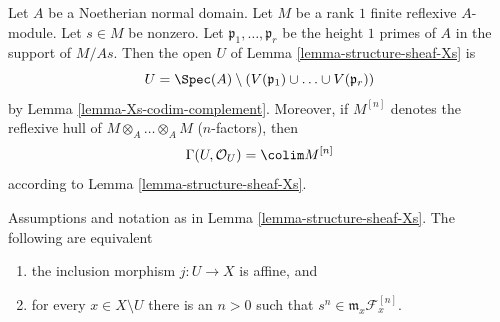 \begin{remark}
\label{remark-structure-sheaf-Xs}
Let $A$ be a Noetherian normal domain. Let $M$ be a rank $1$ finite reflexive
$A$-module. Let $s \in M$ be nonzero. Let $\mathfrak p_1, \ldots, \mathfrak p_r$
be the height $1$ primes of $A$ in the support of $M/As$.
Then the open $U$ of Lemma \ref{lemma-structure-sheaf-Xs} is
$$
U = \Spec(A) \setminus
\left(V(\mathfrak p_1) \cup \ldots \cup V(\mathfrak p_r)\right)
$$
by Lemma \ref{lemma-Xs-codim-complement}. Moreover, if $M^{[n]}$
denotes the reflexive hull of $M \otimes_A \ldots \otimes_A M$
($n$-factors), then
$$
\Gamma(U, \mathcal{O}_U) = \colim M^{[n]}
$$
according to Lemma \ref{lemma-structure-sheaf-Xs}.
\end{remark}

\begin{lemma}
\label{lemma-affine-Xs}
Assumptions and notation as in Lemma \ref{lemma-structure-sheaf-Xs}.
The following are equivalent
\begin{enumerate}
\item the inclusion morphism $j : U \to X$ is affine, and
\item for every $x \in X \setminus U$ there is an $n > 0$
such that $s^n \in \mathfrak m_x \mathcal{F}^{[n]}_x$.
\end{enumerate}
\end{lemma}


